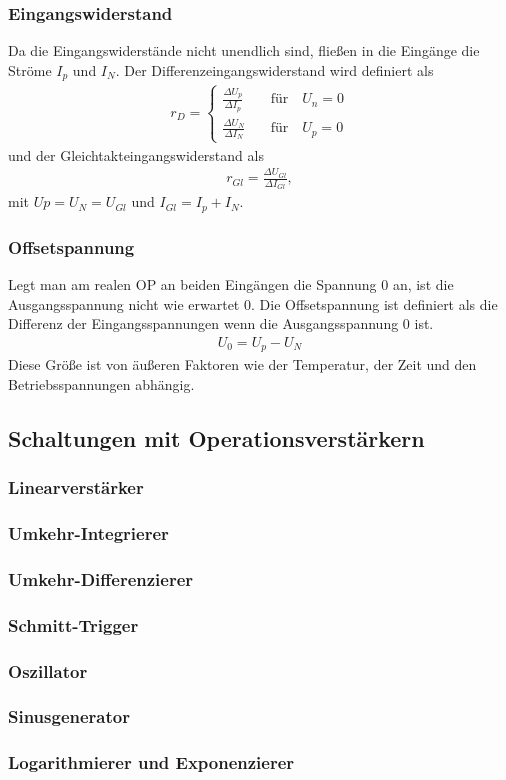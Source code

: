 \subsubsection{Eingangswiderstand}

Da die Eingangswiderstände nicht unendlich sind, fließen in die Eingänge die Ströme $I_p$ und $I_N$.
Der Differenzeingangswiderstand wird definiert als
\begin{align}
	r_D =
	\begin{cases}
		\frac{\Delta U_p}{\Delta I_p} \quad & \text{für} \quad U_n = 0\\
		\frac{\Delta U_N}{\Delta I_N} \quad & \text{für} \quad U_p = 0
	\end{cases}
\end{align}
und der Gleichtakteingangswiderstand als 
\begin{align}
	r_{Gl} = \frac{\Delta U_{Gl}}{\Delta I_{Gl}},
\end{align}
mit $Up = U_N = U_{Gl}$ und $I_{Gl} = I_p + I_N$.

\subsubsection{Offsetspannung}
Legt man am realen OP an beiden Eingängen die Spannung $0$ an, ist die Ausgangsspannung nicht wie erwartet $0$.
Die Offsetspannung ist definiert als die Differenz der Eingangsspannungen wenn die Ausgangsspannung $0$ ist.
\begin{align}
	U_0 = U_p - U_N
\end{align}
Diese Größe ist von äußeren Faktoren wie der Temperatur, der Zeit und den Betriebsspannungen abhängig.

\subsection{Schaltungen mit Operationsverstärkern}

\subsubsection{Linearverstärker}

\subsubsection{Umkehr-Integrierer}

\subsubsection{Umkehr-Differenzierer}

\subsubsection{Schmitt-Trigger}

\subsubsection{Oszillator}

\subsubsection{Sinusgenerator}

\subsubsection{Logarithmierer und Exponenzierer}

